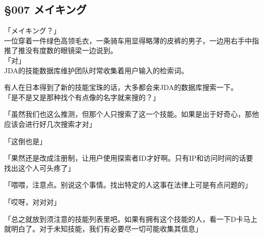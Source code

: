 \subsection{§007 メイキング}

「メイキング？」\\

一位穿着一件绿色高领毛衣，一条骑车用显得略薄的皮裤的男子，一边用右手中指推了推没有度数的眼镜梁一边说到。\\

「对」\\

JDA的技能数据库维护团队时常收集着用户输入的检索词。

有人在日本得到了新的技能宝珠的话，大多都会来JDA的数据库搜索一下。\\

「是不是又是那种找个有点像的名字就来搜的？」

「虽然我们也这么推测，但那个人只搜索了这一个技能。如果是出于好奇心，那他应该会进行好几次搜索才对」

「这倒也是」

「果然还是改成注册制，让用户使用探索者ID才好啊。只有IP和访问时间的话要找出这个人可头疼了」

「喂喂，注意点。别说这个事情。找出特定的人这事在法律上可是有点问题的」

「哎呀，对对对」

「总之就放到须注意的技能列表里吧。如果有拥有这个技能的人，看一下D卡马上就明白了。对于未知技能，我们有必要尽一切可能收集其信息」

